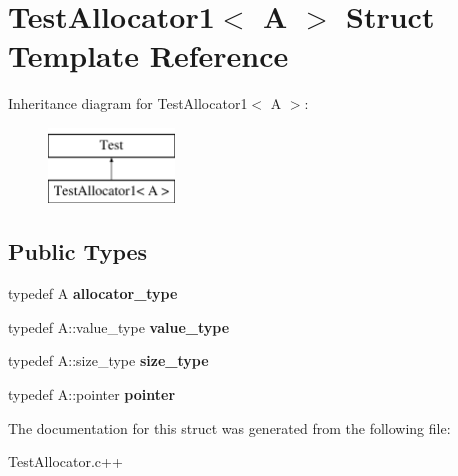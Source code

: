\hypertarget{structTestAllocator1}{\section{Test\-Allocator1$<$ A $>$ Struct Template Reference}
\label{structTestAllocator1}
}
Inheritance diagram for Test\-Allocator1$<$ A $>$\-:\begin{figure}[H]
\begin{center}
\leavevmode
\includegraphics[height=2.000000cm]{structTestAllocator1}
\end{center}
\end{figure}
\subsection*{Public Types}
\begin{DoxyCompactItemize}
\item 
\hypertarget{structTestAllocator1_af833c587251c56fda9cc1169d40545d5}{typedef A {\bfseries allocator\-\_\-type}}\label{structTestAllocator1_af833c587251c56fda9cc1169d40545d5}

\item 
\hypertarget{structTestAllocator1_a92fce0c8423cac5757d6b1d253d646d5}{typedef A\-::value\-\_\-type {\bfseries value\-\_\-type}}\label{structTestAllocator1_a92fce0c8423cac5757d6b1d253d646d5}

\item 
\hypertarget{structTestAllocator1_aa8c669c72a5405cad2024cb1f2d0213d}{typedef A\-::size\-\_\-type {\bfseries size\-\_\-type}}\label{structTestAllocator1_aa8c669c72a5405cad2024cb1f2d0213d}

\item 
\hypertarget{structTestAllocator1_a2d4b518664da974c318e96f1d5fe8cf5}{typedef A\-::pointer {\bfseries pointer}}\label{structTestAllocator1_a2d4b518664da974c318e96f1d5fe8cf5}

\end{DoxyCompactItemize}


The documentation for this struct was generated from the following file\-:\begin{DoxyCompactItemize}
\item 
Test\-Allocator.\-c++\end{DoxyCompactItemize}
